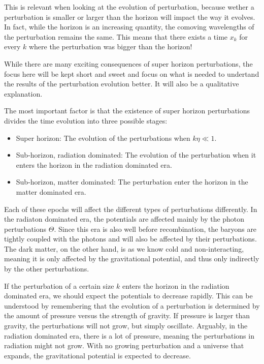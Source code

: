 \documentclass[12pt]{article}
\begin{document}
This is relevant when looking at the evolution of perturbation, because wether a perturbation is smaller or larger than the horizon will impact the way it evolves. In fact, while the horizon is an increasing quantity, the comoving wavelengths of the perturbation remains the same. This means that there exists a time $x_k$ for every $k$ where the perturbation was bigger than the horizon!

While there are many exciting consequences of super horizon perturbations, the focus here will be kept short and sweet and focus on what is needed to undertand the results of the perturbation evolution better. It will also be a qualitative explanation. 

The most important factor is that the existence of super horizon perturbations divides the time evolution into three possible stages:

\begin{itemize}
    \item Super horizon: The evolution of the perturbations when $k\eta \ll 1$.
    \item Sub-horizon, radiation dominated: The evolution of the perturbation when it enters the horizon in the radiation dominated era.
    \item Sub-horizon, matter dominated: The perturbation enter the horizon in the matter dominated era.
\end{itemize}

Each of these epochs will affect the different types of perturbations differently. In the radiaton dominated era, the potentials are affected mainly by the photon perturbations $\Theta$. Since this era is also well before recombination, the baryons are tightly coupled with the photons and will also be affected by their perturbations. The dark matter, on the other hand, is as we know cold and non-interacting, meaning it is only affected by the gravitational potential, and thus only indirectly by the other perturbations. 

If the perturbation of a certain size $k$ enters the horizon in the radiation dominated era, we should expect the potentials to decrease rapidly. This can be understood by remembering that the evolution of a perturbation is determined by the amount of pressure versus the strength of gravity. If pressure is larger than gravity, the perturbations will not grow, but simply oscillate. Arguably, in the radiation dominated era, there is a lot of pressure, meaning the perturbations in radiation might not grow. With no growing perturbation and a universe that expands, the gravitational potential is expected to decrease. 
\end{document}
